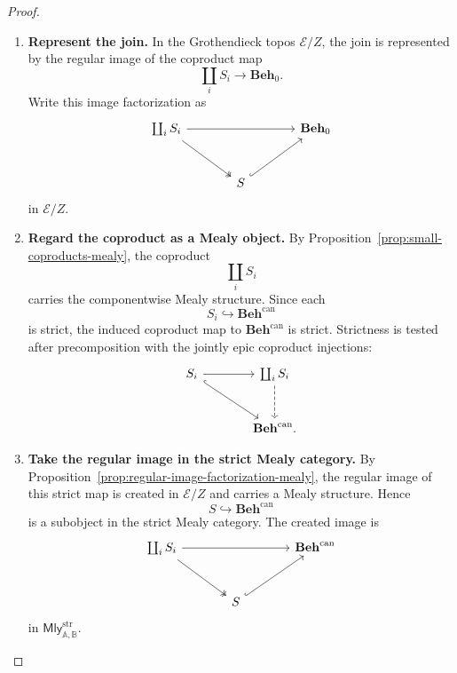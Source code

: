 \begin{proof}
    \leavevmode
    \begin{enumerate}
        \item \textbf{Represent the join.}
        In the Grothendieck topos \(\mathcal E/Z\), the join is represented by
        the regular image of the coproduct map
        \[
            \coprod_iS_i\to\mathbf{Beh}_0.
        \]
        Write this image factorization as
        \[
        \begin{tikzcd}[column sep=large, row sep=large]
            \coprod_iS_i
                \arrow[rr]
                \arrow[dr, two heads]
            &&
            \mathbf{Beh}_0
            \\
            &
            S
                \arrow[ur, hook]
            &
        \end{tikzcd}
        \]
        in \(\mathcal E/Z\).

        \item \textbf{Regard the coproduct as a Mealy object.}
        By Proposition~\ref{prop:small-coproducts-mealy}, the coproduct
        \[
            \coprod_iS_i
        \]
        carries the componentwise Mealy structure. Since each
        \[
            S_i\hookrightarrow\mathbf{Beh}^{\mathrm{can}}
        \]
        is strict, the induced coproduct map to
        \(\mathbf{Beh}^{\mathrm{can}}\) is strict. Strictness is tested after
        precomposition with the jointly epic coproduct injections:
        \[
        \begin{tikzcd}[column sep=large, row sep=large]
            S_i
                \arrow[r]
                \arrow[dr, hook]
            &
            \coprod_iS_i
                \arrow[d, dashed]
            \\
            &
            \mathbf{Beh}^{\mathrm{can}} .
        \end{tikzcd}
        \]

        \item \textbf{Take the regular image in the strict Mealy category.}
        By Proposition~\ref{prop:regular-image-factorization-mealy}, the
        regular image of this strict map is created in \(\mathcal E/Z\) and
        carries a Mealy structure. Hence
        \[
            S\hookrightarrow\mathbf{Beh}^{\mathrm{can}}
        \]
        is a subobject in the strict Mealy category. The created image is
        \[
        \begin{tikzcd}[column sep=large, row sep=large]
            \coprod_iS_i
                \arrow[rr]
                \arrow[dr, two heads]
            &&
            \mathbf{Beh}^{\mathrm{can}}
            \\
            &
            S
                \arrow[ur, hook]
            &
        \end{tikzcd}
        \]
        in \(\mathsf{Mly}^{\mathrm{str}}_{\mathbb A,\mathbb B}\).


\end{enumerate}
\end{proof}
